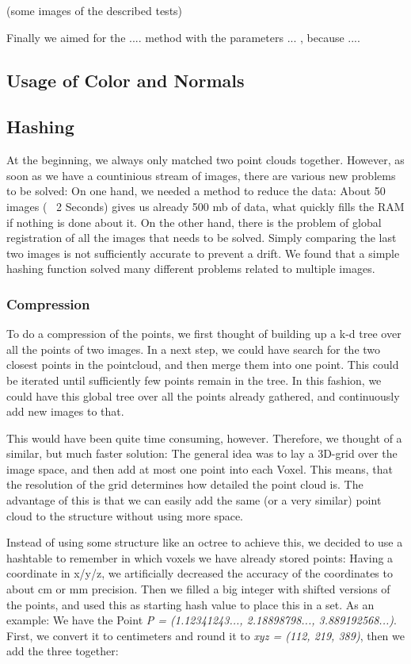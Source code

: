 \documentclass[10pt,twocolumn,letterpaper]{article}
\begin{document}
(some images of the described tests)

Finally we aimed for the .... method with the parameters ... , because ....

\subsection{Usage of Color and Normals}

\subsection{Hashing}
At the beginning, we always only matched two point clouds together. However, as soon as we have a countinious stream of images,
there are various new problems to be solved: On one hand, we needed a method to reduce the data: About 50 images (~ 2 Seconds)
gives us already 500 mb of data, what quickly fills the RAM if nothing is done about it. On the other hand, there is the problem
of global registration of all the images that needs to be solved. Simply comparing the last two images is not sufficiently accurate
to prevent a drift. We found that a simple hashing function solved many different problems related to multiple images.

\subsubsection{Compression}
To do a compression of the points, we first thought of building up a k-d tree over all the points of two images. In a next step, we could have
search for the two closest points in the pointcloud, and then merge them into one point. This could be iterated until sufficiently few
points remain in the tree. In this fashion, we could have this global tree over all the points already gathered, and continuously add new
images to that.

This would have been quite time consuming, however. Therefore, we thought of a similar, but much faster solution:
The general idea was to lay a 3D-grid over the image space, and then add at most one point into each Voxel. This means, that the resolution
of the grid determines how detailed the point cloud is. The advantage of this is that we can easily add the same (or a very similar) point cloud
to the structure without using more space.

Instead of using some structure like an octree to achieve this, we decided to use a hashtable to remember in which voxels we have already stored points:
Having a coordinate in x/y/z, we artificially decreased the accuracy of the coordinates to about cm or mm precision. Then we filled a big integer with
shifted versions of the points, and used this as starting hash value to place this in a set. As an example: We have the Point
\textit{P = (1.12341243..., 2.18898798..., 3.889192568...)}. First, we convert it to centimeters and round
it to \textit{xyz = (112, 219, 389)}, then we add the three together:
\end{document}
